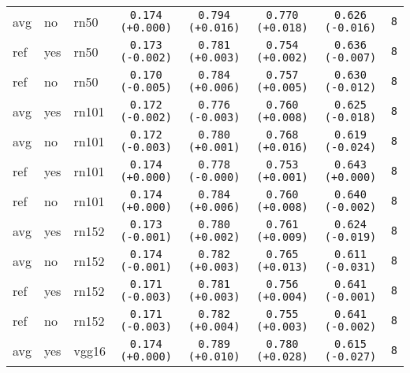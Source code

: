 \begin{tabular}{|l|l|l|c|c|c|c|c|}
avg & no & rn50 & \texttt{0.174 {\color{black}(+0.000)}} & \texttt{0.794 {\color{red}(+0.016)}} & \texttt{0.770 {\color{red}(+0.018)}} & \texttt{0.626 {\color{red}(-0.016)}} & \texttt{8} \\
ref & yes & rn50 & \texttt{0.173 {\color{red}(-0.002)}} & \texttt{0.781 {\color{red}(+0.003)}} & \texttt{0.754 {\color{red}(+0.002)}} & \texttt{0.636 {\color{red}(-0.007)}} & \texttt{8} \\
ref & no & rn50 & \texttt{0.170 {\color{red}(-0.005)}} & \texttt{0.784 {\color{red}(+0.006)}} & \texttt{0.757 {\color{red}(+0.005)}} & \texttt{0.630 {\color{red}(-0.012)}} & \texttt{8} \\
\hline
avg & yes & rn101 & \texttt{0.172 {\color{red}(-0.002)}} & \texttt{0.776 {\color{green}(-0.003)}} & \texttt{0.760 {\color{red}(+0.008)}} & \texttt{0.625 {\color{red}(-0.018)}} & \texttt{8} \\
avg & no & rn101 & \texttt{0.172 {\color{red}(-0.003)}} & \texttt{0.780 {\color{red}(+0.001)}} & \texttt{0.768 {\color{red}(+0.016)}} & \texttt{0.619 {\color{red}(-0.024)}} & \texttt{8} \\
ref & yes & rn101 & \texttt{0.174 {\color{black}(+0.000)}} & \texttt{0.778 {\color{black}(-0.000)}} & \texttt{0.753 {\color{red}(+0.001)}} & \texttt{0.643 {\color{black}(+0.000)}} & \texttt{8} \\
ref & no & rn101 & \texttt{0.174 {\color{black}(+0.000)}} & \texttt{0.784 {\color{red}(+0.006)}} & \texttt{0.760 {\color{red}(+0.008)}} & \texttt{0.640 {\color{red}(-0.002)}} & \texttt{8} \\
\hline
avg & yes & rn152 & \texttt{0.173 {\color{red}(-0.001)}} & \texttt{0.780 {\color{red}(+0.002)}} & \texttt{0.761 {\color{red}(+0.009)}} & \texttt{0.624 {\color{red}(-0.019)}} & \texttt{8} \\
avg & no & rn152 & \texttt{0.174 {\color{red}(-0.001)}} & \texttt{0.782 {\color{red}(+0.003)}} & \texttt{0.765 {\color{red}(+0.013)}} & \texttt{0.611 {\color{red}(-0.031)}} & \texttt{8} \\
ref & yes & rn152 & \texttt{0.171 {\color{red}(-0.003)}} & \texttt{0.781 {\color{red}(+0.003)}} & \texttt{0.756 {\color{red}(+0.004)}} & \texttt{0.641 {\color{red}(-0.001)}} & \texttt{8} \\
ref & no & rn152 & \texttt{0.171 {\color{red}(-0.003)}} & \texttt{0.782 {\color{red}(+0.004)}} & \texttt{0.755 {\color{red}(+0.003)}} & \texttt{0.641 {\color{red}(-0.002)}} & \texttt{8} \\
\hline
avg & yes & vgg16 & \texttt{0.174 {\color{black}(+0.000)}} & \texttt{0.789 {\color{red}(+0.010)}} & \texttt{0.780 {\color{red}(+0.028)}} & \texttt{0.615 {\color{red}(-0.027)}} & \texttt{8} \\

\end{tabular}
